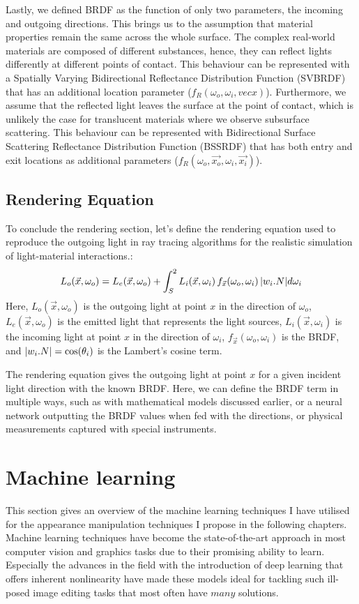 Lastly, we defined BRDF as the function of only two parameters, the incoming and outgoing directions. This brings us to the assumption that material properties remain the same across the whole surface. The complex real-world materials are composed of different substances, hence, they can reflect lights differently at different points of contact. This behaviour can be represented with a Spatially Varying Bidirectional Reflectance Distribution Function (SVBRDF) that has an additional location parameter ($f_R(\omega_o, \omega_i,  vec{x})$). Furthermore, we assume that the reflected light leaves the surface at the point of contact, which is unlikely the case for translucent materials where we observe subsurface  scattering. This behaviour can be represented with Bidirectional Surface Scattering Reflectance Distribution Function (BSSRDF) that has both entry and exit locations as additional parameters ($f_R(\omega_o, \vec{x_o}, \omega_i,  \vec{x_i})$). 

\subsection{Rendering Equation}

To conclude the rendering section, let's define the rendering equation used to reproduce the outgoing light in ray tracing algorithms for the realistic simulation of light-material interactions.:
\begin{equation}
L_o(\vec{x}, \omega_o) = L_e(\vec{x}, \omega_o)  +  \int_S^2 L_i(\vec{x}, \omega_i) \, f_{\vec{x}}(\omega_o,  \omega_i) \, \lvert w_i . N\rvert d\omega_i
\label{eqn:rendering-eqn}
\end{equation}
Here, $L_o(\vec{x}, \omega_o) $ is the outgoing light at point $x$ in the direction of $\omega_o$, $L_e(\vec{x}, \omega_o)$ is the emitted light that represents the light sources, $L_i(\vec{x}, \omega_i) $ is the incoming light at point $x$ in the direction of $\omega_i$, $f_{\vec{x}}(\omega_o,  \omega_i)$ is the BRDF, and $\lvert w_i . N\rvert = \cos(\theta_i)$ is the Lambert's cosine term.

The rendering equation gives the outgoing light at point $x$ for a given incident light direction with the known BRDF. Here, we can define the BRDF term in multiple ways, such as with mathematical models discussed earlier, or a neural network outputting the BRDF values when fed with the directions, or physical measurements captured with special instruments. 

\section{Machine learning}
This section gives an overview of the machine learning techniques I have utilised for the appearance manipulation techniques I propose in the following chapters. Machine learning techniques have become the state-of-the-art approach in most computer vision and graphics tasks due to their promising ability to learn. Especially the advances in the field with the introduction of deep learning that offers inherent nonlinearity have made these models ideal for tackling such ill-posed image editing tasks that most often have $many$ solutions.

